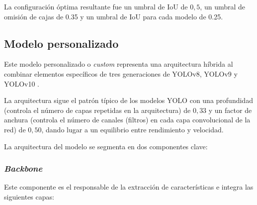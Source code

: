 \documentclass[12pt,a4paper,onecolumn,oneside]{report}
\begin{document}
La configuración óptima resultante fue un umbral de IoU de $0,5$, un umbral de omisión de cajas de 0.35 y un umbral de IoU para cada modelo de 0.25.

\subsection{Modelo personalizado}
\label{sec:Modelo personalizado}
Este modelo personalizado o \textit{custom} representa una arquitectura híbrida al combinar elementos específicos de tres generaciones de YOLOv8, YOLOv9 y YOLOv10 \cite{repoTFM}. 

La arquitectura sigue el patrón típico de los modelos YOLO con una profundidad (controla el número de capas repetidas en la arquitectura) de $0,33$ y un factor de anchura 
(controla el número de canales (filtros) en cada capa convolucional de la red) de $0,50$, dando lugar a un equilibrio entre rendimiento y velocidad.

La arquitectura del modelo se segmenta en dos componentes clave:

\subsubsection{\textit{Backbone}}

Este componente es el responsable de la extracción de características e integra las siguientes capas:

\begin{table}[H]
\caption{Estructura del \textit{backbone} del modelo personalizado}
\centering
{}
\end{table}
\end{document}
